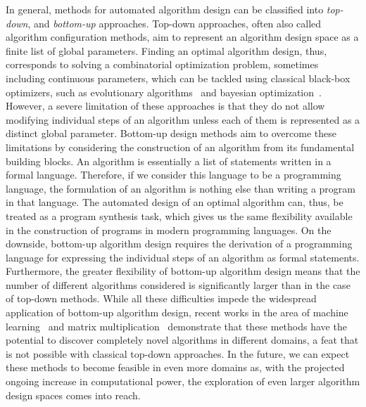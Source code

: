 In general, methods for automated algorithm design can be classified into \emph{top-down}, and \emph{bottom-up} approaches.
Top-down approaches, often also called algorithm configuration methods, aim to represent an algorithm design space as a finite list of global parameters.
Finding an optimal algorithm design, thus, corresponds to solving a combinatorial optimization problem, sometimes including continuous parameters, which can be tackled using classical black-box optimizers, such as evolutionary algorithms~\cite{back1996evolutionary} and bayesian optimization~\cite{frazier2018tutorial}.
However, a severe limitation of these approaches is that they do not allow modifying individual steps of an algorithm unless each of them is represented as a distinct global parameter.
Bottom-up design methods aim to overcome these limitations by considering the construction of an algorithm from its fundamental building blocks.
An algorithm is essentially a list of statements written in a formal language.
Therefore, if we consider this language to be a programming language, the formulation of an algorithm is nothing else than writing a program in that language.
The automated design of an optimal algorithm can, thus, be treated as a program synthesis task, which gives us the same flexibility available in the construction of programs in modern programming languages.
On the downside, bottom-up algorithm design requires the derivation of a programming language for expressing the individual steps of an algorithm as formal statements.
Furthermore, the greater flexibility of bottom-up algorithm design means that the number of different algorithms considered is significantly larger than in the case of top-down methods.
While all these difficulties impede the widespread application of bottom-up algorithm design, recent works in the area of machine learning~\cite{real2020automl,co2021evolving} and matrix multiplication~\cite{fawzi2022discovering} demonstrate that these methods have the potential to discover completely novel algorithms in different domains, a feat that is not possible with classical top-down approaches.
In the future, we can expect these methods to become feasible in even more domains as, with the projected ongoing increase in computational power, the exploration of even larger algorithm design spaces comes into reach.

